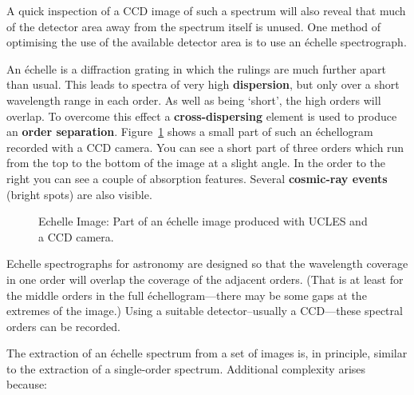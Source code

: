 \documentclass[twoside,11pt]{article}
\newcommand{\htmlref}[2]{#1}
\newcommand{\sgspec}[2]{#1}
\newcommand{\sgspec}[2]{#2}
\begin{document}
A quick inspection of a CCD image of such a spectrum will also reveal
that much of the detector area away from the spectrum itself is unused.
One method of optimising the use of the available detector area is to
use an \'{e}chelle spectrograph.

An \'{e}chelle is a diffraction grating in which the rulings are much
further apart than usual.
This leads to spectra of very high \htmlref{{\bf dispersion}}{gl_dispersion},
but only over a short wavelength range in each order.
As well as being `short', the high orders will overlap.  To overcome
this effect a \htmlref{{\bf cross-dispersing}}{gl_cross_dispersion}
element is used to produce an
\htmlref{{\bf order separation}}{gl_order_separation}.
\sgspec{Figure~\ref{fi_ech_image}}{The figure below}
shows a small part of such
an \'{e}chellogram recorded with a CCD camera.  You can see a short part
of three orders which run from the top to the bottom of the image at a
slight angle.  In the order to the right you can see a couple of
absorption features.  Several \htmlref{{\bf cosmic-ray events}}{gl_cosmic_ray}
(bright spots) are also visible.

\begin{figure}
\begin{center}
\sgspec{\leavevmode\epsfysize=105mm\epsfbox{sg9_04.eps}}
{\leavevmode\epsfysize=136mm}

\parbox{140mm}{
\caption{Echelle Image: Part of an \'{e}chelle image produced with UCLES
         and a CCD camera.}
\label{fi_ech_image}
}
\end{center}
\end{figure}

Echelle spectrographs for astronomy are designed so that the wavelength
coverage in one order will overlap the coverage of the adjacent orders.
(That is at least for the middle orders in the full
\'{e}chellogram\sgspec{---}{ - }there
may be some gaps at the extremes of the image.)  Using a suitable
detector\sgspec{--}{-}usually a CCD\sgspec{---}{ - }these spectral
orders can be recorded.

The extraction of an \'{e}chelle spectrum from a set of images is, in
principle, similar to the extraction of a single-order spectrum.
Additional complexity arises because:
\end{document}
